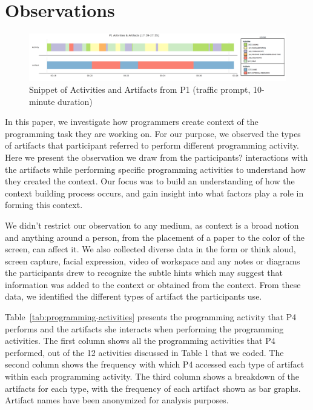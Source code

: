 
\section{Observations}


\vspace{-6pt}
\begin{figure}
\includegraphics[width=\columnwidth]{figures/P1timeplot}
\caption{Snippet of Activities and Artifacts from P1 (traffic prompt, 10-minute duration)}
\end{figure}

In this paper, we investigate how programmers create context of the programming task they are working on. For our purpose, we observed the types of artifacts that participant referred to perform different programming activity. Here we present the observation we draw from the participants? interactions with the artifacts while performing specific programming activities to understand how they created the context. Our focus was to build an understanding of how the context building process occurs, and gain insight into what factors play a role in forming this context. 

We didn't restrict our observation to any medium, as context is a broad notion and anything around a person, from the placement of a paper to the color of the screen, can affect it. We also collected diverse data in the form or think aloud, screen capture, facial expression, video of workspace and any notes or diagrams the participants drew to recognize the subtle hints which may suggest that information was added to the context or obtained from the context. From these data, we identified the different types of artifact the participants use. 

Table~\ref{tab:programming-activities} presents the programming activity that P4 performs and the artifacts she interacts when performing the programming activities. The first column shows all the programming activities that P4 performed, out of the 12 activities discussed in Table 1 that we coded. The second column shows the frequency with which P4 accessed each type of artifact within each programming activity. The third column shows a breakdown of the artifacts for each type, with the frequency of each artifact shown as bar graphs. Artifact names have been anonymized for analysis purposes. 

